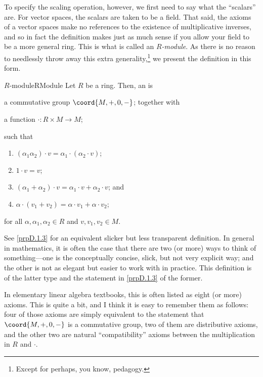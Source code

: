 To specify the scaling operation, however, we first need to say what the ``scalars'' are.  For vector spaces, the scalars are taken to be a field.  That said, the axioms of a vector spaces make no references to the existence of multiplicative inverses, and so in fact the definition makes just as much sense if you allow your field to be a more general ring.  This is what is called an \emph{$R$-module}.  As there is no reason to needlessly throw away this extra generality,\footnote{Except for perhaps, you know, pedagogy.} we present the definition in this form.
\begin{dfn}{$R$-module}{RModule}
Let $R$ be a ring.  Then, an   is
\begin{data}
\item a commutative group $\coord{M,+,0,-}$; together with
\item a function $\cdot \colon R\times M\rightarrow M$;
\end{data}
such that
\begin{enumerate}
\item $(\alpha _1\alpha _2)\cdot v=\alpha _1\cdot (\alpha _2\cdot v)$;
\item $1\cdot v=v$;
\item $(\alpha _1+\alpha _2)\cdot v=\alpha _1\cdot v+\alpha _2\cdot v$; and
\item $\alpha \cdot (v_1+v_2)=\alpha \cdot v_1+\alpha \cdot v_2$;
\end{enumerate}
for all $\alpha ,\alpha _1,\alpha _2\in R$ and $v,v_1,v_2\in M$.
\begin{rmk}
See \cref{prpD.1.3} for an equivalent slicker but less transparent definition.  In general in mathematics, it is often the case that there are two (or more) ways to think of something---one is the conceptually concise, slick, but not very explicit way; and the other is not as elegant but easier to work with in practice.  This definition is of the latter type and the statement in \cref{prpD.1.3} of the former.
\end{rmk}
\begin{rmk}
In elementary linear algebra textbooks, this is often listed as eight (or more) axioms.  This is quite a bit, and I think it is easy to remember them as follows:  four of those axioms are simply equivalent to the statement that $\coord{M,+,0,-}$ is a commutative group, two of them are distributive axioms, and the other two are natural ``compatibility'' axioms between the multiplication in $R$ and $\cdot$.
\end{rmk}

\end{dfn}
